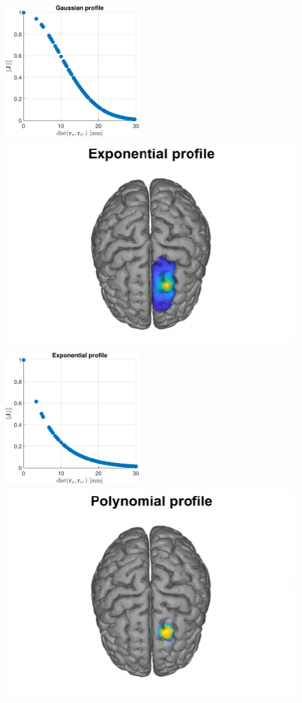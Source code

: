 \begin{figure}
\includegraphics[height=2in]{./img_MATLAB/gauss_Profile}
\includegraphics{./img_MATLAB/exp_GroundTruth}
\includegraphics[height=2in]{./img_MATLAB/exp_Profile}
\includegraphics{./img_MATLAB/circ_GroundTruth}

\end{figure}
